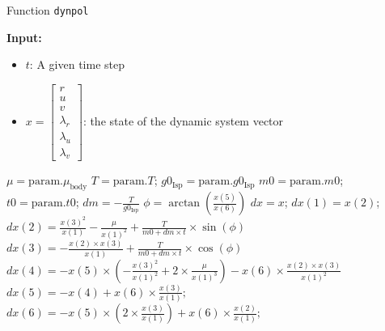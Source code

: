 \documentclass{article}
\begin{document}
	\begin{algorithm}[H]
		\caption{Function \texttt{dynpol}}
		\label{alg:dynpol}
		\begin{algorithmic}
			\State \textbf{Input:}
			\begin{itemize}
				\item $t$: A given time step
				\item $x = \begin{bmatrix} r \\ u \\ v \\ \lambda_r \\ \lambda_u \\ \lambda_v \end{bmatrix}$: the state of the dynamic system vector
				
			\end{itemize}
			\State $\mu = \text{param}.\mu_{\text{body}}$
			\State $T = \text{param}.T$;
			\State $g0_{\text{Isp}} = \text{param}.g0_{\text{Isp}}$
			\State $m0 = \text{param}.m0$;
			\State $t0 = \text{param}.t0$;
			\State $dm = -\frac{T}{g0_{\text{Isp}}}$
			\State $\phi = \arctan\left(\frac{x(5)}{x(6)}\right)$
			\State $dx = x$;
			\State $dx(1) = x(2)$;
			\State $dx(2) = \frac{x(3)^2}{x(1)} - \frac{\mu}{x(1)^2} + \frac{T}{m0 + dm \times t} \times \sin(\phi)$
			\State $dx(3) = -\frac{x(2) \times x(3)}{x(1)} + \frac{T}{m0 + dm \times t} \times \cos(\phi)$
			\State $dx(4) = -x(5) \times \left(-\frac{x(3)^2}{x(1)^2} + 2 \times \frac{\mu}{x(1)^3}\right) - x(6) \times \frac{x(2) \times x(3)}{x(1)^2}$
			\State $dx(5) = -x(4) + x(6) \times \frac{x(3)}{x(1)};$
			\State $dx(6) = -x(5) \times (2 \times \frac{x(3)}{x(1)}) + x(6) \times \frac{x(2)}{x(1)};$
			\EndFunction
		\end{algorithmic}
	\end{algorithm}
	
\end{document}
